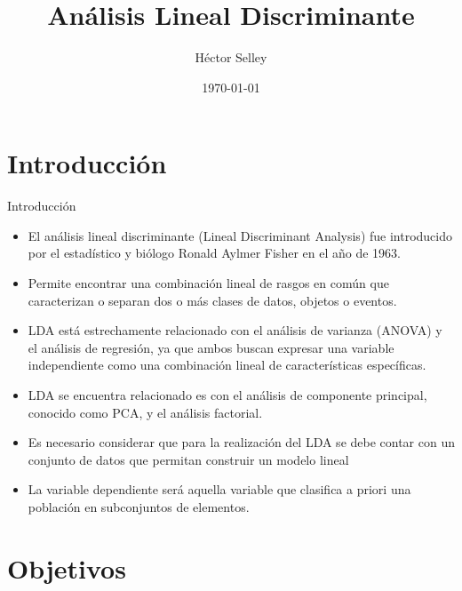 \documentclass[11pt,aspectratio=169]{beamer}
\author{Héctor Selley}
\title{Análisis Lineal Discriminante}
\institute{Universidad Anáhuac México}
\date{\today}
\begin{document}

\begin{frame}
	\titlepage
\end{frame}


\section{Introducción}

\begin{frame}{Introducción}
\begin{itemize}
	\item El análisis lineal discriminante (Lineal Discriminant Analysis) fue introducido por el estadístico y biólogo Ronald Aylmer Fisher 
		en el año de 1963. \pause
	\item Permite encontrar una combinación lineal de rasgos en común que caracterizan o separan dos o más clases de datos, objetos o eventos.\pause
	\item LDA está estrechamente relacionado con el análisis de varianza (ANOVA) y el análisis de regresión, ya que ambos buscan expresar una 
		variable independiente como una combinación lineal de características específicas.\pause
	\item LDA se encuentra relacionado es con el análisis de componente principal, conocido como PCA, y el análisis factorial.\pause
	\item Es necesario considerar que para la realización del LDA se debe contar con un conjunto de datos que permitan construir un modelo lineal\pause
	\item La variable dependiente será aquella variable que clasifica a priori una población en subconjuntos de elementos.
\end{itemize}
\end{frame}

\section{Objetivos}
\end{document}
